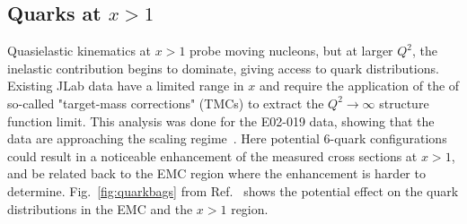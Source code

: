 \subsection{Quarks at $x>1$}
Quasielastic kinematics at $x>1$ probe moving nucleons, but at larger $Q^2$, the inelastic contribution begins to dominate, giving access to quark distributions. Existing JLab data have a limited range in $x$ and require the application of the of so-called "target-mass corrections" (TMCs) to extract the $Q^2 \to \infty$ structure function limit.  This analysis was done for the E02-019 data, showing that the data are approaching the scaling regime~\cite{Fomin:2010ei}.  Here potential 6-quark configurations could result in a noticeable enhancement of the measured cross sections at $x>1$, and be related back to the EMC region where the enhancement is harder to determine.  Fig.~\ref{fig:quarkbags} from Ref.~\cite{Arrington:2003qt} shows the potential effect on the quark distributions in the EMC and the $x>1$ region.

